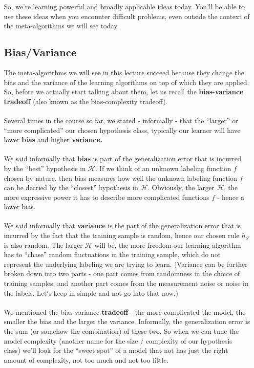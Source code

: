 \documentclass[11pt]{article}
\newcommand{\Hc}{\mathcal{H}}
\begin{document}
%
So, we're learning powerful
and broadly applicable ideas today.
 You'll be able to use these ideas when you
encounter difficult problems, even outside the context of the meta-algorithms we
will see today.

\subsection{Bias/Variance}

The meta-algorithms we will see in this lecture succeed because they change the
bias and the variance of the learning algorithms on top of which they are
applied. 
So, before we actually start talking about them, let us recall the {\bf bias-variance tradeoff} (also known as
the bias-complexity tradeoff). 
\\~\\
Several times in the course so far, we stated - informally - that the ``larger''
or ``more complicated'' our chosen hypothesis class, typically 
our learner will have lower
{\bf bias}
 and higher {\bf variance.}
\\~\\
 We said informally that {\bf bias} is part of the generalization error that is 
 incurred by the ``best'' hypothesis in $\Hc$. If
 we think of an unknown labeling function $f$ chosen by nature, 
 then bias measures how well the unknown labeling function $f$ can be decried by the
 ``closest'' hypothesis in $\Hc$. Obviously, the larger $\Hc$, the more
 expressive power it has to describe more complicated functions $f$ - hence a
 lower bias.
\\~\\
 We said informally that {\bf variance} is the part of the generalization error that is
 incurred by the fact that the training sample is random, hence our chosen rule
 $h_S$ is also random. The larger $\Hc$ will be, the more freedom our learning
 algorithm has to ``chase'' random fluctuations in the training sample, which do
 not represent the underlying labeling we are trying to learn. (Variance can be
   further broken down into two parts - one part comes from randomness in
   the choice of training samples, and another part comes from the measurement
 noise or noise in the labels. Let's keep in simple and not go into that now.)
\\~\\
 We mentioned the bias-variance {\bf tradeoff} - the more complicated the model,
 the smaller the bias and the larger the variance. Informally, the
 generalization error is the sum (or somehow the combination) of these two. So
 when we can tune the model complexity (another name for the size / complexity
 of our hypothesis class) we'll look for the ``sweet spot'' of a model that not
 has just the right amount of complexity, not too much and not too little.
\end{document}
